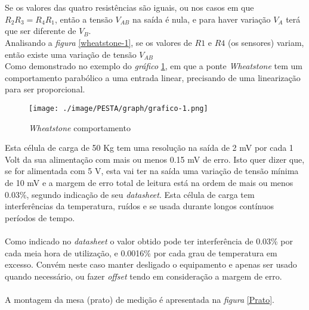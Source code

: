 \\
\\ 
Se os valores das quatro resistências são iguais, ou nos casos em que $R_2 R_3 = R_4 R_1$, então a tensão $V_{AB}$ na saída é nula, e para haver variação $V_A$ terá que ser diferente de $V_B$.
\\
Analisando a \textit{figura} \ref{wheatstone-1}, se os valores de $R1$ e $R4$ (os sensores) variam, então existe uma variação de tensão $V_{AB}$
\\
Como demonstrado no exemplo do \textit{gráfico} \ref{wheatstone-reaction}, em que a ponte \textit{Wheatstone} tem um comportamento parabólico a uma entrada linear, precisando de uma linearização para ser proporcional.
\\
\begin{minipage}[!b]{\linewidth}
	\begin{figure}[H]
		\centering
		\texttt{[image: ./image/PESTA/graph/grafico-1.png]}
		\caption{\textit{Wheatstone} comportamento}
		\label{wheatstone-reaction}
	\end{figure}
\end{minipage}
Esta célula de carga de 50 Kg tem uma resolução na saída de 2 mV por cada 1 Volt da sua alimentação com mais ou menos 0.15 mV de erro. Isto quer dizer que, se for alimentada com 5 V, esta vai ter na saída uma variação de tensão mínima de 10 mV e a margem de erro total de leitura está na ordem de mais ou menos 0.03\%, segundo indicação de seu \textit{datasheet}.
Esta célula de carga tem interferências da temperatura, ruídos e se usada durante longos contínuos períodos de tempo.
\\
\\
Como indicado no \textit{datasheet} o valor obtido pode ter interferência de 0.03\% por cada meia hora de utilização, e 0.0016\% por cada grau de temperatura em excesso. Convém neste caso manter desligado o equipamento e apenas ser usado quando necessário, ou fazer \textit{offset} tendo em consideração a margem de erro.
\\
\\
A montagem da mesa (prato) de medição é apresentada na \textit{figura} \ref{Prato}.
